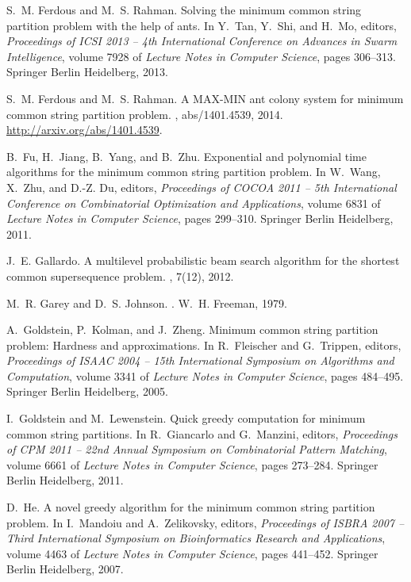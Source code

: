 \documentclass[11pt,a4paper]{article}
\begin{document}
\begin{thebibliography}{10}
S.~M. Ferdous and M.~S. Rahman.
\newblock Solving the minimum common string partition problem with the help of
  ants.
\newblock In Y.~Tan, Y.~Shi, and H.~Mo, editors, {\em Proceedings of ICSI 2013
  -- 4th International Conference on Advances in Swarm Intelligence}, volume
  7928 of {\em Lecture Notes in Computer Science}, pages 306--313. Springer
  Berlin Heidelberg, 2013.

S.~M. Ferdous and M.~S. Rahman.
\newblock A {MAX-MIN} ant colony system for minimum common string partition
  problem.
, abs/1401.4539, 2014.
\newblock \url{http://arxiv.org/abs/1401.4539}.

B.~Fu, H.~Jiang, B.~Yang, and B.~Zhu.
\newblock Exponential and polynomial time algorithms for the minimum common
  string partition problem.
\newblock In W.~Wang, X.~Zhu, and D.-Z. Du, editors, {\em Proceedings of COCOA
  2011 -- 5th International Conference on Combinatorial Optimization and
  Applications}, volume 6831 of {\em Lecture Notes in Computer Science}, pages
  299--310. Springer Berlin Heidelberg, 2011.

J.~E. Gallardo.
\newblock A multilevel probabilistic beam search algorithm for the shortest
  common supersequence problem.
, 7(12), 2012.

M.~R. Garey and D.~S. Johnson.
.
\newblock W.~H. Freeman, 1979.

A.~Goldstein, P.~Kolman, and J.~Zheng.
\newblock Minimum common string partition problem: Hardness and approximations.
\newblock In R.~Fleischer and G.~Trippen, editors, {\em Proceedings of ISAAC
  2004 -- 15th International Symposium on Algorithms and Computation}, volume
  3341 of {\em Lecture Notes in Computer Science}, pages 484--495. Springer
  Berlin Heidelberg, 2005.

I.~Goldstein and M.~Lewenstein.
\newblock Quick greedy computation for minimum common string partitions.
\newblock In R.~Giancarlo and G.~Manzini, editors, {\em Proceedings of CPM 2011
  -- 22nd Annual Symposium on Combinatorial Pattern Matching}, volume 6661 of
  {\em Lecture Notes in Computer Science}, pages 273--284. Springer Berlin
  Heidelberg, 2011.

D.~He.
\newblock A novel greedy algorithm for the minimum common string partition
  problem.
\newblock In I.~Mandoiu and A.~Zelikovsky, editors, {\em Proceedings of ISBRA
  2007 -- Third International Symposium on Bioinformatics Research and
  Applications}, volume 4463 of {\em Lecture Notes in Computer Science}, pages
  441--452. Springer Berlin Heidelberg, 2007.


\end{thebibliography}
\end{document}
